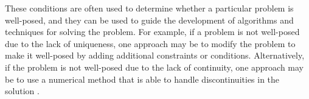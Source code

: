 These conditions are often used to determine whether a particular problem is well-posed, and they can be used to guide the development of algorithms and techniques for solving the problem. For example, if a problem is not well-posed due to the lack of uniqueness, one approach may be to modify the problem to make it well-posed by adding additional constraints or conditions. Alternatively, if the problem is not well-posed due to the lack of continuity, one approach may be to use a numerical method that is able to handle discontinuities in the solution \cite{Shacham2002NumericalSO, Lakhdari2015AnIR}.
